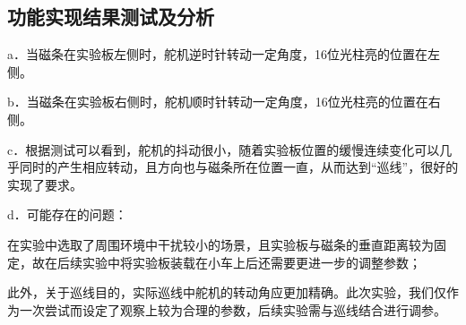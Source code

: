 \subsection{功能实现结果测试及分析}
\par{a．当磁条在实验板左侧时，舵机逆时针转动一定角度，16位光柱亮的位置在左侧。}

\par{b．当磁条在实验板右侧时，舵机顺时针转动一定角度，16位光柱亮的位置在右侧。}

\begin{figure}[htbp]
\centering

%
%

\centering
\label{fig:4.2}
\end{figure}

\par{c．根据测试可以看到，舵机的抖动很小，随着实验板位置的缓慢连续变化可以几乎同时的产生相应转动，且方向也与磁条所在位置一直，从而达到“巡线”，很好的实现了要求。}

\par{d．可能存在的问题：}
\par{在实验中选取了周围环境中干扰较小的场景，且实验板与磁条的垂直距离较为固定，故在后续实验中将实验板装载在小车上后还需要更进一步的调整参数；}
\par{此外，关于巡线目的，实际巡线中舵机的转动角应更加精确。此次实验，我们仅作为一次尝试而设定了观察上较为合理的参数，后续实验需与巡线结合进行调参。}

